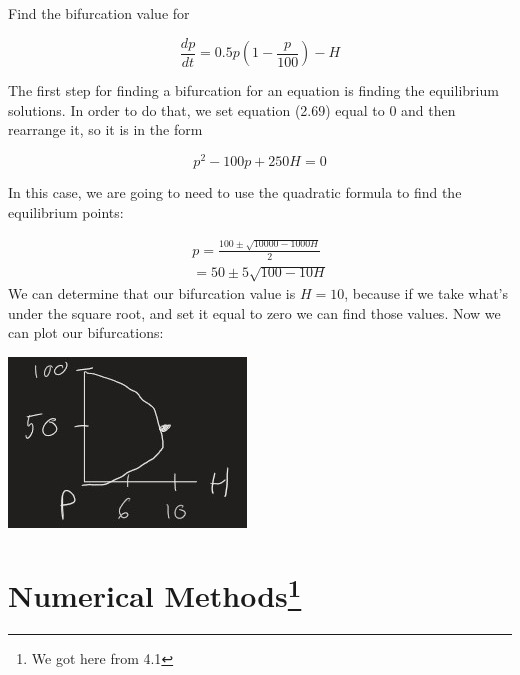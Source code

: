   \begin{problem}
    Find the bifurcation value for 

    \[
      \frac{dp}{dt}=0.5p\left(1-\frac{p}{100}\right)-H
    \]

    The first step for finding a bifurcation for an equation is finding the equilibrium solutions. In order to do that, we set equation (2.69) equal to 0 and then rearrange it, so it is in the form

    \[
      p^2-100p+250H=0
    \]

    In this case, we are going to need to use the quadratic formula to find the equilibrium points:

    \begin{align*}
      p=\frac{100\pm\sqrt{10000-1000H}}{2}\\
      =50\pm5\sqrt{100-10H}
    \end{align*}
    We can determine that our bifurcation value is $H=10$, because if we take what's under the square root, and set it equal to zero we can find those values.
    Now we can plot our bifurcations:
    \begin{center}
      \includegraphics{resource/images/2.7 Example 3 1.jpg}
    \end{center}
  \end{problem}
  \section{Numerical Methods\footnote{We got here from 4.1}}
